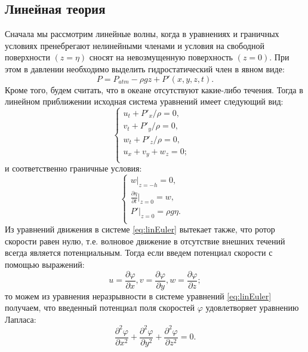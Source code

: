 \subsection{Линейная теория} \label{sect_linTheory_norming}

Сначала мы рассмотрим линейные волны, когда в уравнениях и граничных условиях пренебрегают нелинейными членами и условия на свободной поверхности $(z=\eta)$ сносят на невозмущенную поверхность  $(z = 0)$. При этом в давлении необходимо выделить гидростатический член в явном виде:
\begin{equation}\label{eq:linPel}
  P = P_{atm}-\rho gz+P'(x,y,z,t).
\end{equation}
Кроме того, будем считать, что в океане отсутствуют какие-либо течения. Тогда в линейном приближении исходная система
уравнений имеет следующий вид:
\begin{equation}\label{eq:linEuler}
\begin{cases}
    u_t+P'_x/\rho=0, &\\
    v_t+P'_y/\rho=0, &\\
    w_t+P'_z/\rho=0, &\\
    u_x+v_y+w_z=0; &\\
\end{cases}
\end{equation}
и соответственно граничные условия:
\begin{equation}\label{eq:granUslLin}
\begin{cases}
    w|_{z=-h}=0, &\\
    \frac{\partial \eta}{\partial t}|_{z=0}=w, &\\
    P'|_{z=0}=\rho g\eta. &\\
\end{cases}
\end{equation}
Из уравнений движения в системе \eqref{eq:linEuler} вытекает также, что ротор скорости равен нулю, т.е. волновое движение в отсутствие внешних течений всегда является потенциальным. Тогда если введем потенциал скорости с помощью выражений:
\begin{equation}\label{eq:potenLin}
u=\frac{\partial \varphi}{\partial x},v=\frac{\partial \varphi}{\partial y},w=\frac{\partial \varphi}{\partial z};
\end{equation}
то можем из уравнения неразрывности в системе уравнений \eqref{eq:linEuler} получаем, что введенный потенциал поля скоростей $\varphi$ удовлетворяет уравнению Лапласа:
\begin{equation}\label{eq:laplasLin}
\frac{\partial^2 \varphi}{\partial x^2}+\frac{\partial^2 \varphi}{\partial y^2}+\frac{\partial^2 \varphi}{\partial z^2}=0.
\end{equation}
